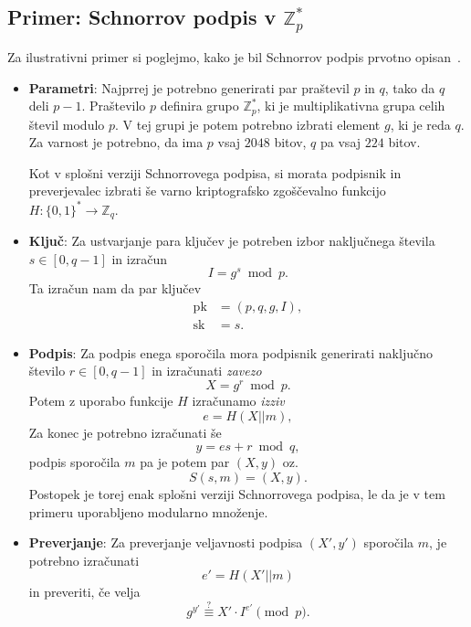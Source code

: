 \documentclass[isrm2, tisk]{fmfdelo}
\newcommand{\Z}{\mathbb Z}
\begin{document}
\subsection{Primer: Schnorrov podpis v \texorpdfstring{$\Z_p^*$}{Zp∗}}
Za ilustrativni primer si poglejmo, kako je bil Schnorrov podpis prvotno opisan~\cite{schnorr1989sig}.
\begin{itemize}
    \item \textbf{Parametri}:
    Najprrej je potrebno generirati par praštevil $p$ in $q$, tako da $q$ deli $p - 1$. Praštevilo $p$
    definira grupo $\Z_p^*$, ki je multiplikativna grupa celih števil modulo $p$. V tej grupi je potem
    potrebno izbrati element $g$, ki je reda $q$. Za varnost je potrebno, da ima $p$ vsaj $2048$ bitov,
    $q$ pa vsaj $224$ bitov.

    Kot v splošni verziji Schnorrovega podpisa, si morata podpisnik in preverjevalec izbrati še varno
    kriptografsko zgoščevalno funkcijo $H : \{0, 1\}^* \rightarrow \Z_q$.

    \item \textbf{Ključ}:
    Za ustvarjanje para ključev je potreben izbor naključnega števila $s \in [0, q - 1]$
    in izračun 
    $$ 
    I = g^s \bmod p.
    $$
    Ta izračun nam da par ključev
    \begin{align*}
    \text{pk} &= (p, q, g, I), \\
    \text{sk} &= s.
    \end{align*}

    \item \textbf{Podpis}:
    Za podpis enega sporočila mora podpisnik generirati naključno število $r \in [0, q-1]$ in izračunati 
    \textit{zavezo} 
    $$ 
    X = g^r \bmod p.
    $$ 
    Potem z uporabo funkcije $H$ izračunamo \textit{izziv} 
    $$
    e = H(X || m),
    $$
    Za konec je potrebno izračunati še 
    $$ 
    y = es + r \bmod q, 
    $$
    podpis sporočila $m$ pa je potem par $(X, y)$ oz.\ 
    $$ 
    S(s, m) = (X, y).
    $$
    Postopek je torej enak splošni verziji Schnorrovega podpisa, le da je v tem primeru uporabljeno
    modularno množenje.

    \item \textbf{Preverjanje}:
    Za preverjanje veljavnosti podpisa $(X', y')$ sporočila $m$, je potrebno izračunati 
    $$ 
    e' = H(X' || m)
    $$
    in preveriti, če velja 
    \begin{equation}
        g^{y'} \stackrel{?}{\equiv} X' \cdot I^{e'} \pmod p. \label{eq:schnorr-ver}
    \end{equation}
\end{itemize}
\end{document}
